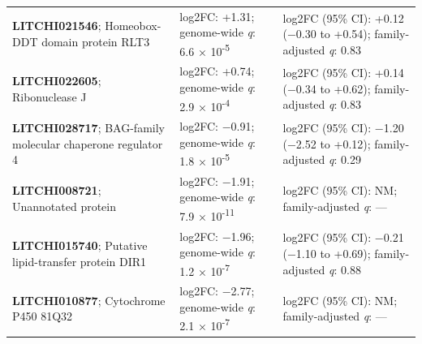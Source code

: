\documentclass[12pt,letterpaper]{article}
\begin{document}
\begin{longtable}{@{}>{\raggedright\arraybackslash}p{}>{\raggedright\arraybackslash}p{}>{\raggedright\arraybackslash}p{}@{}}
\textbf{LITCHI021546}; Homeobox-DDT domain protein RLT3 & log2FC: +1.31; genome-wide \textit{q}: 6.6 × 10\textsuperscript{-5} & log2FC (95\% CI): +0.12 (−0.30 to +0.54); family-adjusted \textit{q}: 0.83 \\
\textbf{LITCHI022605}; Ribonuclease J & log2FC: +0.74; genome-wide \textit{q}: 2.9 × 10\textsuperscript{-4} & log2FC (95\% CI): +0.14 (−0.34 to +0.62); family-adjusted \textit{q}: 0.83 \\
\textbf{LITCHI028717}; BAG-family molecular chaperone regulator 4 & log2FC: −0.91; genome-wide \textit{q}: 1.8 × 10\textsuperscript{-5} & log2FC (95\% CI): −1.20 (−2.52 to +0.12); family-adjusted \textit{q}: 0.29 \\
\textbf{LITCHI008721}; Unannotated protein & log2FC: −1.91; genome-wide \textit{q}: 7.9 × 10\textsuperscript{-11} & log2FC (95\% CI): NM; family-adjusted \textit{q}: — \\
\textbf{LITCHI015740}; Putative lipid-transfer protein DIR1 & log2FC: −1.96; genome-wide \textit{q}: 1.2 × 10\textsuperscript{-7} & log2FC (95\% CI): −0.21 (−1.10 to +0.69); family-adjusted \textit{q}: 0.88 \\
\textbf{LITCHI010877}; Cytochrome P450 81Q32 & log2FC: −2.77; genome-wide \textit{q}: 2.1 × 10\textsuperscript{-7} & log2FC (95\% CI): NM; family-adjusted \textit{q}: — \\
\end{longtable}
\end{document}
